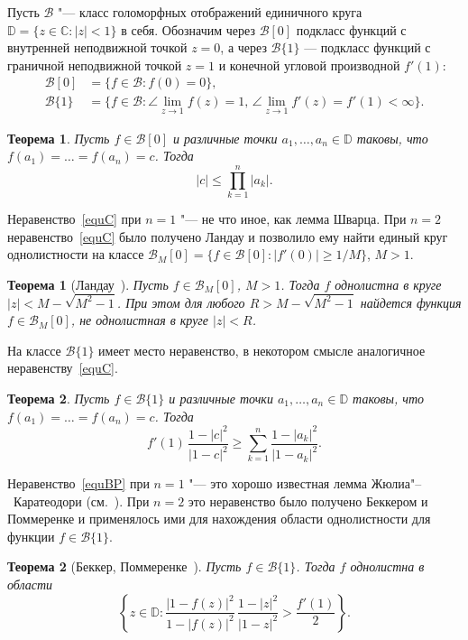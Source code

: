 \documentclass{article}
\theoremstyle{definition}
\theoremstyle{plain}
\newtheorem{theorem}{Теорема}
\newtheorem{OldTheorem}{Теорема}
\begin{document}
Пусть $\mathscr B$ "--- класс голоморфных отображений единичного круга $\mathbb D=\{z\in \mathbb C\colon |z|<1\}$ в себя. Обозначим через
$\mathscr B[0]$ подкласс функций с внутренней неподвижной точкой $z=0$, а через $\mathscr B\{1\}$  --- подкласс функций с граничной неподвижной точкой $z=1$ и конечной угловой производной $f'(1)$:
\begin{align*}
\mathscr B[0]
&=\bigl\{f\in \mathscr B\colon f(0)=0 \bigr\},\\
\mathscr B\{1\}&=\bigl\{f\in \mathscr B\colon
\angle\lim\limits_{z\to 1}f(z)=1,\, \angle\lim\limits_{z\to 1}f'(z)=f'(1)<\infty
\bigr\}.
\end{align*}
\begin{theorem} \label{th1}
	Пусть $f\in \mathscr B[0]$ и различные точки $a_1,\ldots,a_n\in \mathbb D$ таковы, что $f(a_1)=\ldots=f(a_n)=c$. Тогда
	\begin{equation}\label{equC}
		|c|\leqslant \prod_{k=1}^n|a_k|.
	\end{equation}
\end{theorem}	
Неравенство~\eqref{equC} при $n=1$ "--- не что иное, как лемма Шварца. При $n=2$ неравенство~\eqref{equC}
было получено Ландау и позволило ему найти единый  круг однолистности на классе %
$
\mathscr B_{M}[0]=\bigl\{
f\in \mathscr B[0]\colon  |f'(0)|\geqslant 1/M
\bigr\}$, $M>1$.

\begin{OldTheorem}[\rm {Ландау~\cite{Lan}}]\label{thLan}
	Пусть $f\in \mathscr B_M[0]$, 	$M>1$.
	Тогда $f$ однолистна в круге
	$|z|<M-\sqrt{M^2-1}$.
	При этом для любого $R>M-\sqrt{M^2-1}$ найдется функция $f\in \mathscr B_M[0]$, не  однолистная  в круге $|z|<R$. 	
\end{OldTheorem}
На классе  $\mathscr B\{1\}$ имеет место неравенство, в некотором смысле аналогичное неравенству~\eqref{equC}.
\begin{theorem}\label{th2}
	Пусть  $f\in \mathscr B\{1\}$
	и  различные точки $a_1,\ldots,a_n\in \mathbb D$ таковы, что $f(a_1)=\ldots=f(a_n)=c$. Тогда
	\begin{equation}\label{equBP}
		f'(1)\,\frac{1-|c|^2}{|1-c|^2}\geqslant
		\sum_{k=1}^{n}\frac{1-|a_k|^2}{|1-a_k|^2}.
	\end{equation}
\end{theorem}
Неравенство~\eqref{equBP} при $n=1$ "--- это хорошо известная лемма Жюлиа"--~Каратеодори (см.~\cite[гл.~1, \S~1.4, теорема~1.5]{Ahl}). При $n=2$ это неравенство было получено Беккером и Поммеренке и применялось ими для нахождения области однолистности для функции $f\in\mathscr B\{1\}$.
\begin{OldTheorem}[Беккер, Поммеренке~\cite{BeckerPom}]\label{thBP}
	Пусть $f\in \mathscr B\{1\}$.
	Тогда $f$ однолистна в области
	\begin{equation*}\label{v2}
		\left\{ z\in\mathbb D\colon   \frac{|1-f(z)|^2}{1-|f(z)|^2}\,\frac{1-|z|^2}{|1-z|^2}>\frac {f'(1)}2
		\right\}.
	\end{equation*}
\end{OldTheorem}
\end{document}
